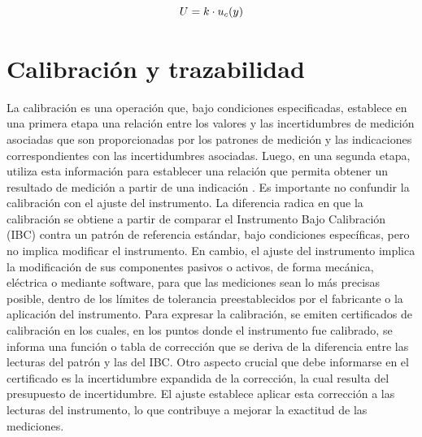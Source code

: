 \begin{equation}
    \centering
    U = k \cdot u_{c}(y)
    \label{eq:incertidumbreExpandida}
\end{equation}

\section{Calibración y trazabilidad}\label{sec:trazabilidad}


La calibración es una operación que, bajo condiciones especificadas, establece en una primera etapa una relación entre los valores y las incertidumbres de medición asociadas que son proporcionadas por los patrones de medición y las indicaciones correspondientes con las incertidumbres asociadas. Luego, en una segunda etapa, utiliza esta información para establecer una relación que permita obtener un resultado de medición a partir de una indicación \cite{VIM}. Es importante no confundir la calibración con el ajuste del instrumento. La diferencia radica en que la calibración se obtiene a partir de comparar el Instrumento Bajo Calibración (IBC) contra un patrón de referencia estándar, bajo condiciones específicas, pero no implica modificar el instrumento. En cambio, el ajuste del instrumento implica la modificación de sus componentes pasivos o activos, de forma mecánica, eléctrica o mediante software, para que las mediciones sean lo más precisas posible, dentro de los límites de tolerancia preestablecidos por el fabricante o la aplicación del instrumento. Para expresar la calibración, se emiten certificados de calibración en los cuales, en los puntos donde el instrumento fue calibrado, se informa una función o tabla de corrección que se deriva de la diferencia entre las lecturas del patrón y las del IBC. Otro aspecto crucial que debe informarse en el certificado es la incertidumbre expandida de la corrección, la cual resulta del presupuesto de incertidumbre. El ajuste establece aplicar esta corrección a las lecturas del instrumento, lo que contribuye a mejorar la exactitud de las mediciones. 

